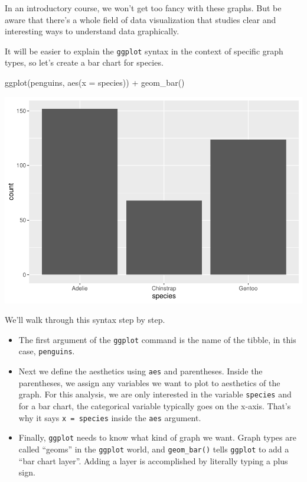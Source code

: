 \documentclass[
]{book}
\newenvironment{Shaded}{\begin{snugshade}}{\end{snugshade}}
\newcommand{\AttributeTok}[1]{\textcolor[rgb]{0.77,0.63,0.00}{#1}}
\newcommand{\FunctionTok}[1]{\textcolor[rgb]{0.00,0.00,0.00}{#1}}
\newcommand{\NormalTok}[1]{#1}
\newcommand{\SpecialCharTok}[1]{\textcolor[rgb]{0.00,0.00,0.00}{#1}}
\providecommand{\tightlist}{%
  \setlength{\itemsep}{0pt}\setlength{\parskip}{0pt}}
\begin{document}
In an introductory course, we won't get too fancy with these graphs. But be aware that there's a whole field of data visualization that studies clear and interesting ways to understand data graphically.

It will be easier to explain the \texttt{ggplot} syntax in the context of specific graph types, so let's create a bar chart for species.

\begin{Shaded}
\begin{Highlighting}[]
\FunctionTok{ggplot}\NormalTok{(penguins, }\FunctionTok{aes}\NormalTok{(}\AttributeTok{x =}\NormalTok{ species)) }\SpecialCharTok{+}
    \FunctionTok{geom\_bar}\NormalTok{()}
\end{Highlighting}
\end{Shaded}

\includegraphics{intro_stats_files/figure-latex/unnamed-chunk-55-1.pdf}

We'll walk through this syntax step by step.

\begin{itemize}
\tightlist
\item
  The first argument of the \texttt{ggplot} command is the name of the tibble, in this case, \texttt{penguins}.
\item
  Next we define the aesthetics using \texttt{aes} and parentheses. Inside the parentheses, we assign any variables we want to plot to aesthetics of the graph. For this analysis, we are only interested in the variable \texttt{species} and for a bar chart, the categorical variable typically goes on the x-axis. That's why it says \texttt{x\ =\ species} inside the \texttt{aes} argument.
\item
  Finally, \texttt{ggplot} needs to know what kind of graph we want. Graph types are called ``geoms'' in the \texttt{ggplot} world, and \texttt{geom\_bar()} tells \texttt{ggplot} to add a ``bar chart layer''. Adding a layer is accomplished by literally typing a plus sign.
\end{itemize}
\end{document}
